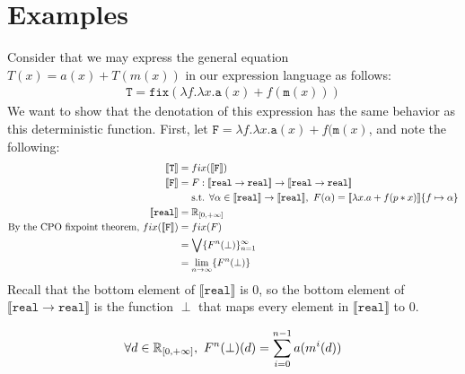 \section{Examples}
Consider that we may express the general equation $T(x) = a(x) + T(m(x))$ in our expression language as follows:
 \begin{align*}
 \texttt{T} = \texttt{fix}(\lambda f. \lambda x.\texttt{a}(x) + f (\texttt{m}(x)))
 \end{align*}
 We want to show that the denotation of this expression has the same behavior as this deterministic function. First, let 
 $\texttt{F} = \lambda f. \lambda x.\texttt{a}(x) + f (\texttt{m}(x)$, and note the following:
 \begin{align*}
 \llbracket \texttt{T} \rrbracket &= fix(\llbracket \texttt{F} \rrbracket) \\
 \llbracket \texttt{F} \rrbracket &= F : \llbracket \texttt{real} \rightarrow \texttt{real}\rrbracket \rightarrow \llbracket \texttt{real} \rightarrow 
 \texttt{real}\rrbracket \\ &\text{ \ \ \ s.t. } \forall \alpha \in \llbracket \texttt{real}\rrbracket \rightarrow \llbracket \texttt{real}
 \rrbracket, \ 
 F(\alpha) = \llbracket \lambda x.a + f (p * x)\rrbracket\{f \mapsto \alpha\} \\
 \llbracket \texttt{real}\rrbracket &= \R_{[0, +\infty]}  
 \\\text{By the CPO fixpoint theorem, } fix(\llbracket \texttt{F} \rrbracket) &= fix(F) \\
&= \bigvee\{F^n (\perp)\}^{\infty}_{n=1} \\
&= \lim_{n \to \infty}\{F^n (\perp)\}
 \end{align*}
 Recall that the bottom element of $\llbracket \texttt{real} \rrbracket$ is $0$, so the bottom element of $\llbracket \texttt{real} 
 \rightarrow \texttt{real}\rrbracket$ is the function $\perp$ that maps every element in $\llbracket \texttt{real} \rrbracket$ to 
 $0$.  \\
 \begin{lemma}
 \label{lem2}
 \begin{align*}
 \forall d \in \mathbb{R}_{[0, +\infty]}, \ F^n(\perp)(d) = \sum_{i = 0}^{n-1}a(m^{i}(d))
 \end{align*}
 \end{lemma}
